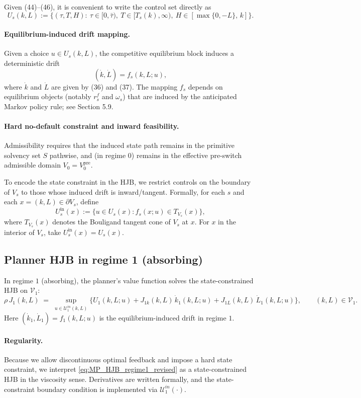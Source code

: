 \documentclass{article}
\begin{document}
Given (44)–(46), it is convenient to write the control set directly as
\[
U_s(k,L):=\Big\{(\tau,T,H):\ \tau\in[0,\bar\tau),\ T\in[T_s(k),\infty),\ H\in[\max\{0,-L\},\,k]\Big\}.
\tag{47}
\]

\paragraph{Equilibrium-induced drift mapping.}
Given a choice $u\in U_s(k,L)$, the competitive equilibrium block induces a deterministic drift
\[
(\dot k,\dot L)=f_s(k,L;u),
\]
where $\dot k$ and $\dot L$ are given by (36) and (37). The mapping $f_s$ depends on equilibrium objects (notably $r^f_s$
and $\omega_s$) that are induced by the anticipated Markov policy rule; see Section 5.9.

\paragraph{Hard no-default constraint and inward feasibility.}
Admissibility requires that the induced state path remains in the primitive solvency set $S$ pathwise, and (in regime 0)
remains in the effective pre-switch admissible domain $V_0=V_0^{\mathrm{pre}}$.

To encode the state constraint in the HJB, we restrict controls on the boundary of $V_s$ to those whose induced drift is
inward/tangent. Formally, for each $s$ and each $x=(k,L)\in\partial V_s$, define
\[
U^{\mathrm{in}}_s(x):=\big\{u\in U_s(x): f_s(x;u)\in T_{V_s}(x)\big\},
\tag{48}
\]
where $T_{V_s}(x)$ denotes the Bouligand tangent cone of $V_s$ at $x$. For $x$ in the interior of $V_s$, take
$U^{\mathrm{in}}_s(x)=U_s(x)$.

\subsection{Planner HJB in regime 1 (absorbing)}\label{subsec:HJB_regime1}

In regime $1$ (absorbing), the planner's value function solves the state-constrained HJB on $\mathcal V_1$:
\begin{equation}
\rho\,J_1(k,L)
\;=\;
\sup_{u\in \mathcal U^{in}_1(k,L)}
\Big\{
U_1(k,L;u)
+
J_{1k}(k,L)\,\dot k_1(k,L;u)
+
J_{1L}(k,L)\,\dot L_1(k,L;u)
\Big\},
\qquad (k,L)\in \mathcal V_1.
\label{eq:MP_HJB_regime1_revised}
\end{equation}
Here $(\dot k_1,\dot L_1)=f_1(k,L;u)$ is the equilibrium-induced drift in regime $1$.

\paragraph{Regularity.}
Because we allow discontinuous optimal feedback and impose a hard state constraint, we interpret
\eqref{eq:MP_HJB_regime1_revised} as a state-constrained HJB in the viscosity sense. Derivatives are
written formally, and the state-constraint boundary condition is implemented via $\mathcal U^{in}_1(\cdot)$.
\end{document}
